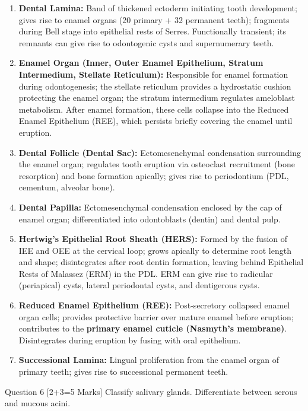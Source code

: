 \documentclass[11pt,a4paper]{article}
\begin{document}
\begin{ansbox}
\begin{enumerate}[leftmargin=*]
    \item \textbf{Dental Lamina:} Band of thickened ectoderm initiating tooth development; gives rise to enamel organs (20 primary + 32 permanent teeth); fragments during Bell stage into epithelial rests of Serres. Functionally transient; its remnants can give rise to odontogenic cysts and supernumerary teeth.
    \item \textbf{Enamel Organ (Inner, Outer Enamel Epithelium, Stratum Intermedium, Stellate Reticulum):} Responsible for enamel formation during odontogenesis; the stellate reticulum provides a hydrostatic cushion protecting the enamel organ; the stratum intermedium regulates ameloblast metabolism. After enamel formation, these cells collapse into the Reduced Enamel Epithelium (REE), which persists briefly covering the enamel until eruption.
    \item \textbf{Dental Follicle (Dental Sac):} Ectomesenchymal condensation surrounding the enamel organ; regulates tooth eruption via osteoclast recruitment (bone resorption) and bone formation apically; gives rise to periodontium (PDL, cementum, alveolar bone).
    \item \textbf{Dental Papilla:} Ectomesenchymal condensation enclosed by the cap of enamel organ; differentiated into odontoblasts (dentin) and dental pulp.
    \item \textbf{Hertwig's Epithelial Root Sheath (HERS):} Formed by the fusion of IEE and OEE at the cervical loop; grows apically to determine root length and shape; disintegrates after root dentin formation, leaving behind Epithelial Rests of Malassez (ERM) in the PDL. ERM can give rise to radicular (periapical) cysts, lateral periodontal cysts, and dentigerous cysts.
    \item \textbf{Reduced Enamel Epithelium (REE):} Post-secretory collapsed enamel organ cells; provides protective barrier over mature enamel before eruption; contributes to the \textbf{primary enamel cuticle (Nasmyth's membrane)}. Disintegrates during eruption by fusing with oral epithelium.
    \item \textbf{Successional Lamina:} Lingual proliferation from the enamel organ of primary teeth; gives rise to successional permanent teeth.
\end{enumerate}
\end{ansbox}

\begin{qbox}{Question 6 [2+3=5 Marks]}
Classify salivary glands. Differentiate between serous and mucous acini.
\end{qbox}
\end{document}
